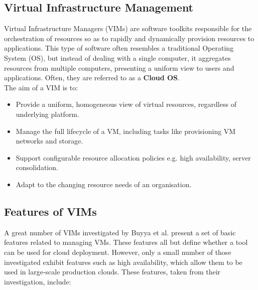 \subsection{Virtual Infrastructure Management}
Virtual Infrastructure Managers (VIMs) are software toolkits responsible for the orchestration of resources so as to rapidly and dynamically provision resources to applications\cite{vimprivatehybrid}. This type of software often resembles a traditional Operating System (OS), but instead of dealing with a single computer, it aggregates resources from multiple computers, presenting a uniform view to users and applications\cite{principlesparadigms}. Often, they are referred to as a \textbf{Cloud OS}\cite{vmwarevsphere}. \\ 
The aim of a VIM is to\cite{vimprivatehybrid}:
\begin{itemize}
\itemsep0em
\item Provide a uniform, homogeneous view of virtual resources, regardless of underlying platform. 
\item Manage the full lifecycle of a VM, including tasks like provisioning VM networks and storage. 
\item Support configurable resource allocation policies e.g. high availability, server consolidation. 
\item Adapt to the changing resource needs of an organisation. 
\end{itemize} 

\subsection{Features of VIMs}
A great number of VIMs investigated by Buyya et al.\cite{principlesparadigms} present a set of basic features related to managing VMs. These features all but define whether a tool can be used for cloud deployment. However, only a small number of those investigated exhibit features such as high availability, which allow them to be used in large-scale production clouds. These features, taken from their investigation, include:

